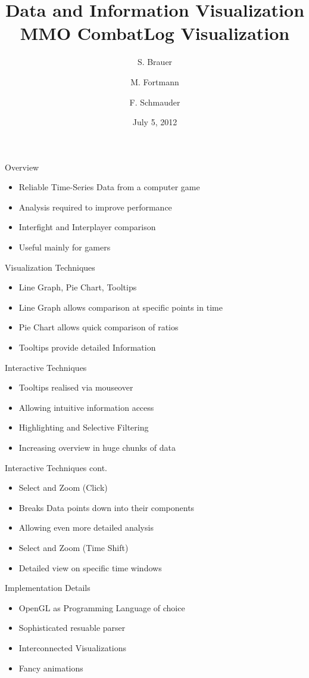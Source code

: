 \documentclass{beamer}
\title[Project Presentation]{Data and Information Visualization \\ MMO CombatLog Visualization}
\author[Brauer, Fortmann, Schmauder]
{S. Brauer \and M. Fortmann \and F. Schmauder}
\institute[UPB]{Institute for Computer Science}
\date{July 5, 2012}
\begin{document}
\begin{frame}
  \titlepage
\end{frame}

\begin{frame}{Overview}
\begin{itemize}
	\item Reliable Time-Series Data from a computer game
	\item Analysis required to improve performance
	\item Interfight and Interplayer comparison
	\item Useful mainly for gamers
\end{itemize}
\end{frame}

\begin{frame}{Visualization Techniques}
\begin{itemize}
	\item Line Graph, Pie Chart, Tooltips
	\item Line Graph allows comparison at specific points in time
	\item Pie Chart allows quick comparison of ratios
	\item Tooltips provide detailed Information
\end{itemize}
\end{frame}

\begin{frame}{Interactive Techniques}
\begin{itemize}
	\item Tooltips realised via mouseover
	\item Allowing intuitive information access
	\item Highlighting and Selective Filtering
	\item Increasing overview in huge chunks of data
\end{itemize}
\end{frame}

\begin{frame}{Interactive Techniques cont.}
\begin{itemize}
	\item Select and Zoom (Click)
	\item Breaks Data points down into their components
	\item Allowing even more detailed analysis
	\item Select and Zoom (Time Shift)
	\item Detailed view on specific time windows
\end{itemize}
\end{frame}

\begin{frame}{Implementation Details}
\begin{itemize}
	\item OpenGL as Programming Language of choice
	\item Sophisticated resuable parser
	\item Interconnected Visualizations
	\item \alert{Fancy} animations
\end{itemize}
\end{frame}
\end{document}
